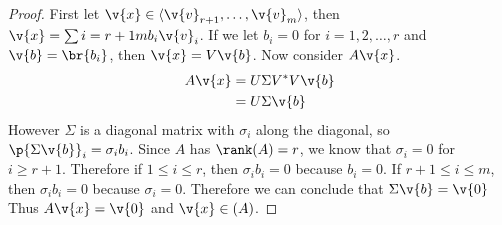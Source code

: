 \documentclass[11pt]{article}
\begin{document}
\begin{enumerate}
        \begin{proof}
            First let $\v{x} \in \langle\v{v}_{r+1}, \ldots, \v{v}_m\rangle$, then
            $\v{x} = \sum{i = r+1}{m}{b_i \v{v}_i}$.
            If we let $b_i = 0$ for $i = 1, 2, \ldots, r$ and $\v{b} = \br{b_i}$,
            then $\v{x} = V\v{b}$.
            Now consider $A\v{x}$.
            \begin{align*}
                A\v{x} &= U\Sigma V^* V \v{b} \\
                       &= U \Sigma \v{b}
            \end{align*}
            However $\Sigma$ is a diagonal matrix with $\sigma_i$ along the
            diagonal, so $\p{\Sigma \v{b}}_i = \sigma_i b_i$.
            Since $A$ has $\rank(A) = r$, we know that $\sigma_i = 0$ for
            $i \ge r + 1$.
            Therefore if $1 \le i \le r$, then $\sigma_i b_i = 0$ because
            $b_i = 0$.
            If $r + 1 \le i \le m$, then $\sigma_i b_i = 0$ because
            $\sigma_i = 0$.
            Therefore we can conclude that $\Sigma \v{b} = \v{0}$
            Thus $A\v{x} = \v{0}$ and $\v{x} \in \null(A)$.


\end{proof}
\end{enumerate}
\end{document}
